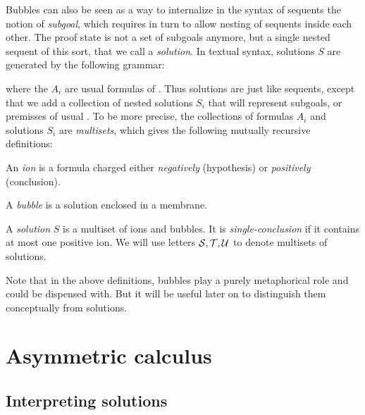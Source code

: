 Bubbles can also be seen as a way to internalize in the syntax of sequents the
notion of \emph{subgoal}, which requires in turn to allow nesting of sequents
inside each other. The proof state is not a set of subgoals anymore, but a
single nested sequent of this sort, that we call a \emph{solution}. In textual syntax, solutions $S$ are generated by the
following grammar:
where the $A_i$ are usual formulas of . Thus solutions are just like
sequents, except that we add a collection of nested solutions $S_i$ that will
represent subgoals, or premisses of usual . To be more precise,
the collections of formulas $A_i$ and solutions $S_i$ are \emph{multisets},
which gives the following mutually recursive definitions:
\begin{definition}[Ion]
An \emph{ion} is a formula charged either \emph{negatively} (hypothesis) or
\emph{positively} (conclusion).
\end{definition}
\begin{definition}[Bubble]
A \emph{bubble} is a solution enclosed in a membrane.
\end{definition}
\begin{definition}[Solution]
A \emph{solution} $S$ is a multiset of ions and bubbles. It is
\emph{single-conclusion} if it contains at most one positive ion. We will use
letters $\mathcal{S}, \mathcal{T}, \mathcal{U}$ to denote multisets of
solutions.
\end{definition}
Note that in the above definitions, bubbles play a purely metaphorical role and
could be dispensed with. But it will be useful later on to distinguish them
conceptually from solutions.

\section{Asymmetric calculus}

\subsection{Interpreting solutions}

